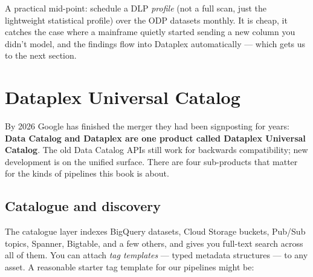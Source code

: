 \documentclass[
  11pt,
  british,
  oneside]{book}
\begin{document}
A practical mid-point: schedule a DLP \emph{profile} (not a full scan,
just the lightweight statistical profile) over the ODP datasets monthly.
It is cheap, it catches the case where a mainframe quietly started
sending a new column you didn't model, and the findings flow into
Dataplex automatically --- which gets us to the next
section.

\hypertarget{dataplex-universal-catalog}{%
\section{Dataplex Universal Catalog}\label{dataplex-universal-catalog}}

By 2026 Google has finished the merger they had been signposting for
years: \textbf{Data Catalog and Dataplex are one product called Dataplex
Universal Catalog}. The old Data Catalog APIs still work
for backwards compatibility; new development is on the unified surface.
There are four sub-products that matter for the kinds of pipelines this
book is about.

\hypertarget{catalogue-and-discovery}{%
\subsection{Catalogue and discovery}\label{catalogue-and-discovery}}

The catalogue layer indexes BigQuery datasets, Cloud Storage buckets,
Pub/Sub topics, Spanner, Bigtable, and a few others, and gives you
full-text search across all of them. You can attach \emph{tag templates}
--- typed metadata structures --- to any asset. A
reasonable starter tag template for our pipelines might be:
\end{document}
